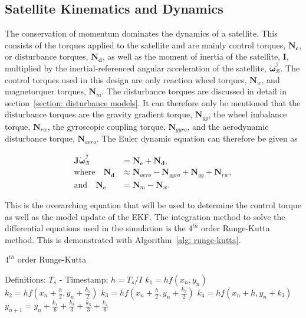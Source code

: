 \subsection{Satellite Kinematics and Dynamics}
The conservation of momentum dominates the dynamics of a satellite. This consists of the torques applied to the satellite and are mainly control torques, $\mathbf{N_c}$, or disturbance torques, $\mathbf{N_d}$, as well as the moment of inertia of the satellite, $\mathbf{I}$, multiplied by the inertial-referenced angular acceleration of the satellite, $\boldsymbol{\dot{\omega}}_{\mathcal{B}}^{\mathcal{I}}$. The control torques used in this design are only reaction wheel torques, $\mathbf{N}_w$, and magnetorquer torques, $\mathbf{N}_m$. The disturbance torques are discussed in detail in section~\ref{section: disturbance models}. It can therefore only be mentioned that the disturbance torques are the gravity gradient torque, $\mathbf{N}_{gg}$, the wheel imbalance torque, $\mathbf{N}_{rw}$, the gyroscopic coupling torque, $\mathbf{N}_{gyro}$, and the aerodynamic disturbance torque, $\mathbf{N}_{aero}$. The Euler dynamic equation can therefore be given as

\begin{equation}
\begin{aligned}
	\mathbf{J}\boldsymbol{\dot{\omega}}_{\mathcal{B}}^{\mathcal{I}} &= \mathbf{N_c} + \mathbf{N_d}, \\
	\text{where} \quad \mathbf{N_d} &\approx \mathbf{N}_{aero} - \mathbf{N}_{gyro} + \mathbf{N}_{gg} + \mathbf{N}_{rw}, \\
	\text{and} \quad \mathbf{N_c} &= \mathbf{N}_{m} - \mathbf{N}_{w}.
\end{aligned}
\label{Eq-EulerDynamic}
\end{equation}

This is the overarching equation that will be used to determine the control torque as well as the model update of the EKF. The integration method to solve the differential equations used in the simulation is the $4^{th}$ order Runge-Kutta method. This is demonstrated with Algorithm~\ref{alg: runge-kutta}.

\begin{algorithm}[!htb]
	\caption[$4^{th}$ order Runge-Kutta]{$4^{th}$ order Runge-Kutta}
	\label{alg: runge-kutta}
	\begin{algorithmic}[1]
		\State Definitions: $T_s$ - Timestamp; 
		\State $h = T_s/I$ 
		\State	$k_1 = hf(x_n, y_n)$
		\State	$k_2 = hf(x_n + \frac{h}{2}, y_n + \frac{k_1}{2})$
		\State	$k_3 = hf(x_n + \frac{h}{2}, y_n + \frac{k_2}{2})$
		\State	$k_4 = hf(x_n + h, y_n + k_3)$
		\State	$y_{n+1}=y_n + \frac{k_1}{6} + \frac{k_2}{3} + \frac{k_3}{3} + \frac{k_4}{6}$
		\EndFor

	\end{algorithmic}
\end{algorithm}

